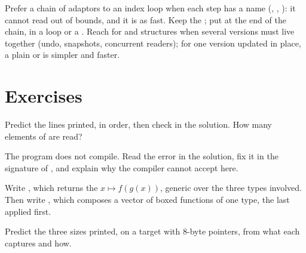 \begin{inpractice}
Prefer a chain of adaptors to an index loop when each step has a name (, , ): it
cannot read out of bounds, and it is as fast. Keep the  ; put  at the end of the chain, in a
 loop or a . Reach for  and  structures when several versions must live
together (undo, snapshots, concurrent readers); for one version updated in place, a plain  or
 is simpler and faster.
\end{inpractice}

\section{Exercises}\label{sec:b2:functional-programming:exercises}

\begin{exercise}[$\star$]\label{exo:b2:functional-programming:1}
Predict the lines printed, in order, then check in the solution. How many elements of  are read?
\end{exercise}

\begin{exercise}[$\star$]\label{exo:b2:functional-programming:2}
The program does not compile. Read the error in the solution, fix it in the signature of , and
explain why the compiler cannot accept  here.
\end{exercise}

\begin{exercise}[$\star$]\label{exo:b2:functional-programming:3}
Write , which returns the  $x \mapsto f(g(x))$, generic over the three types involved.
Then write , which composes a vector of boxed functions of one type, the last applied first.
\end{exercise}

\begin{exercise}[$\star$]\label{exo:b2:functional-programming:4}
Predict the three sizes printed, on a target with 8-byte pointers, from what each  captures and how.
\end{exercise}

